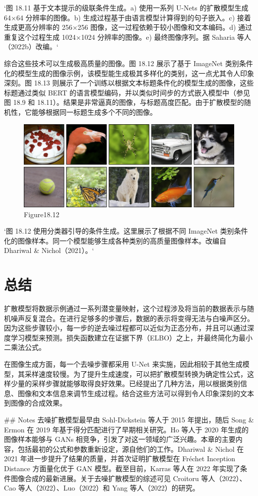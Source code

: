`图 18.11 基于文本提示的级联条件生成。a) 使用一系列 U-Nets 的扩散模型生成 64×64 分辨率的图像。b) 生成过程基于由语言模型计算得到的句子嵌入。c) 接着生成更高分辨率的 256×256 图像，这一过程依赖于较小图像和文本编码。d) 通过重复这个过程生成 1024×1024 分辨率的图像。e) 最终图像序列。据 Saharia 等人（2022b）改编。`

综合这些技术可以生成极高质量的图像。图 18.12 展示了基于 ImageNet 类别条件化的模型生成的图像示例，该模型能生成极其多样化的类别，这一点尤其令人印象深刻。图 18.13 则展示了一个训练以根据文本标题条件化的模型生成的图像，这些标题通过类似 BERT 的语言模型编码，并以类似时间步的方式嵌入模型中（参见图 18.9 和 18.11）。结果是非常逼真的图像，与标题高度匹配。由于扩散模型的随机性，它能够根据同一标题生成多个不同的图像。

\begin{figure}[h!]
\centering
\includegraphics[width=0.7\linewidth]{png/chapter18/DiffusionConditional.png}
\caption{Figure18.12}
\end{figure}

`图 18.12 使用分类器引导的条件生成。这里展示了根据不同 ImageNet 类别条件化的图像样本。同一个模型能够生成各种类别的高质量图像样本。改编自 Dhariwal & Nichol（2021）。`

\section{总结}
扩散模型将数据示例通过一系列潜变量映射，这个过程涉及将当前的数据表示与随机噪声反复混合。在进行足够多的步骤后，数据的表示将变得无法与白噪声区分。因为这些步骤较小，每一步的逆去噪过程都可以近似为正态分布，并且可以通过深度学习模型来预测。损失函数建立在证据下界（ELBO）之上，并最终简化为最小二乘法公式。

在图像生成方面，每一个去噪步骤都采用 U-Net 来实施，因此相较于其他生成模型，其采样速度较慢。为了提升生成速度，可以把扩散模型转换为确定性公式，这样少量的采样步骤就能够取得良好效果。已经提出了几种方法，用以根据类别信息、图像和文本信息来调节生成过程。结合这些方法可以得到令人印象深刻的文本到图像的合成效果。

## Notes
去噪扩散模型最早由 Sohl-Dickstein 等人于 2015 年提出，随后 Song & Ermon 在 2019 年基于得分匹配进行了早期相关研究。Ho 等人于 2020 年生成的图像样本能够与 GANs 相竞争，引发了对这一领域的广泛兴趣。本章的主要内容，包括最初的公式和参数重新设定，源自他们的工作。Dhariwal & Nichol 在 2021 年进一步提升了结果的质量，并首次证明扩散模型在 Fréchet Inception Distance 方面量化优于 GAN 模型。截至目前，Karras 等人在 2022 年实现了条件图像合成的最新进展。关于去噪扩散模型的综述可见 Croitoru 等人（2022）、Cao 等人（2022）、Luo（2022）和 Yang 等人（2022）的研究。

